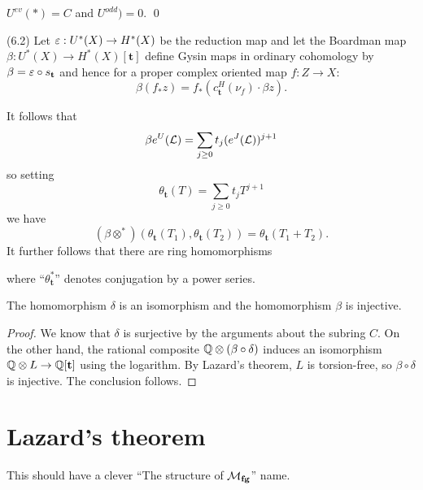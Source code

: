 \begin{corollary}
$U^{ev}(*) = C$ and $U^{odd}) = 0$. \qed
\end{corollary}

\begin{definition}(6.2)
Let $\varepsilon: U^*(X) \to H^*(X)$ be the reduction map and let the Boardman map $\beta: U^*(X) \to H^*(X)[\mathbf t]$ define Gysin maps in ordinary cohomology by $\beta = \varepsilon \circ s_{\mathbf t}$ and hence for a proper complex oriented map $f: Z \to X$: \[\beta(f_* z) = f_*(c_{\mathbf t}^H(\nu_f) \cdot \beta z).\] 
\end{definition}

\begin{definition}
It follows that \[\beta e^U(\mathcal{L}) = \sum_{j \ge 0} t_j(e^J(\mathcal{L}))^{j+1}\] so setting \[\theta_{\mathbf t}(T) = \sum_{j \ge 0} t_j T^{j+1}\] we have \[(\beta \otimes^*)(\theta_{\mathbf t}(T_1), \theta_{\mathbf t}(T_2)) = \theta_{\mathbf t}(T_1 + T_2).\]  It further follows that there are ring homomorphisms
\begin{center}
\end{center}
where ``$\theta_{\mathbf t}^*$'' denotes conjugation by a power series.
\end{definition}

\begin{theorem}
The homomorphism $\delta$ is an isomorphism and the homomorphism $\beta$ is injective.
\end{theorem}
\begin{proof}
We know that $\delta$ is surjective by the arguments about the subring $C$.  On the other hand, the rational composite $\mathbb{Q} \otimes (\beta \circ \delta)$ induces an isomorphism $\mathbb{Q} \otimes L \to \mathbb{Q}[\mathbf t]$ using the logarithm.  By Lazard's theorem, $L$ is torsion-free, so $\beta \circ \delta$ is injective.  The conclusion follows.
\end{proof}


\section{Lazard's theorem}

This should have a clever ``The structure of $\mathcal{M}_{\mathbf{fg}}$'' name.

